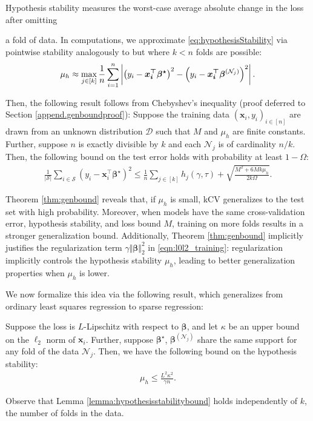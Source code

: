 \documentclass[mnsc,nonblindrev]{informs3} %
\begin{document}
Hypothesis stability measures the worst-case average absolute change in the loss after omitting {\color{black}a fold of data. In computations, we approximate \eqref{eq:hypothesisStability} via pointwise stability analogously to \citep[][Definition 4]{bousquet2002stability} but where $k<n$ folds are possible:
\begin{align}\label{eq:hypothesisStability2}\color{black}
	\mu_h\approx\max_{j\in [k]}\frac{1}{n}\sum_{i=1}^n \left\vert \left(y_i-\bm{x_i^\top\bm{\beta}^\star} \right)^2-\left(y_i-\bm{x_i^\top \beta}^{(\mathcal{N}_j)} \right)^2\right\vert.
\end{align}

Then, the following result follows from Chebyshev's inequality (proof deferred to Section \ref{append.genboundproof}):
\theorem{}\label{thm:genbound}
Suppose the training data $(\bm{x}_i, y_i)_{i \in [n]}$ are drawn from an unknown distribution $\mathcal{D}$ such that $M$ and $\mu_h$ are finite constants. Further, suppose $n$ is exactly divisible by $k$ and each $\mathcal{N}_j$ is of cardinality $n/k$. Then, the following bound on the test error holds with probability at least $1-\Omega$:
\begin{align}\label{l10ucb}
	\frac{1}{\vert \mathcal{S}\vert} \sum_{i \in \mathcal{S}} (y_i-\bm{x}_i^\top \bm{\beta}^\star)^2 \leq \frac{1}{n} \sum_{j \in [k]} h_j(\gamma, \tau)+\sqrt{\frac{M^2+6 M k \mu_h}{2 k \Omega}}.
\end{align}

\endtheorem\normalfont
Theorem \ref{thm:genbound} reveals that, if $\mu_h$ is small, kCV generalizes to the test set with high probability. Moreover, when models have the same cross-validation error, hypothesis stability, and loss bound $M$, training on more folds results in a stronger generalization bound. 
Additionally, Theorem \ref{thm:genbound} implicitly justifies the regularization term $\gamma \Vert \bm{\beta}\Vert_2^2$ in \eqref{eqn:l0l2_training}: regularization implicitly controls the hypothesis stability $\mu_h$, leading to better generalization properties when $\mu_h$ is lower. 

We now formalize this idea via the following result, which generalizes \citet[Theorem 22]{bousquet2002stability} from {ordinary least squares} regression to sparse regression:
\begin{lemma}\label{lemma:hypothesisstabilitybound}
Suppose the loss is $L$-Lipschitz with respect to $\bm{\beta}$, and let $\kappa$ be an upper bound on the $\ell_2$ norm of $\bm{x}_i$. Further, suppose  $\bm{\beta}^\star$, $\bm{\beta}^{(\mathcal{N}_j)}$ share the same support for any fold of the data $\mathcal{N}_j$. Then, we have the following bound on the hypothesis stability:
\begin{align}
    \mu_h \leq \frac{L^2 \kappa^2}{\gamma n}.
\end{align}
\end{lemma}
Observe that Lemma \ref{lemma:hypothesisstabilitybound} holds independently of $k$, the number of folds in the data. 

}
\end{document}
